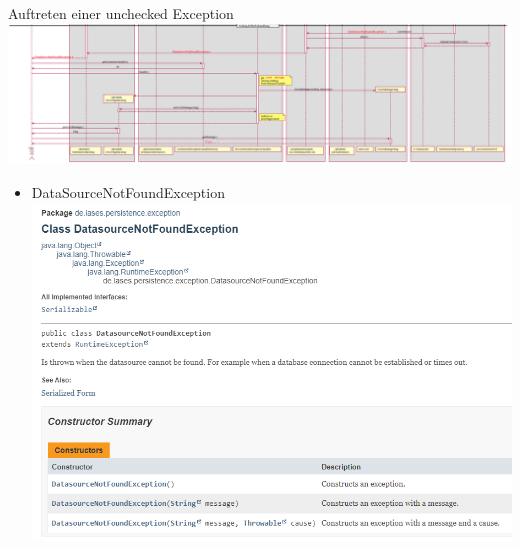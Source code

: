 \documentclass{beamer}
\begin{document}
    \begin{frame}{Auftreten einer unchecked Exception}
        \centering
        \includegraphics[height=1.1\textheight]{graphics/exc/seq_ex}
        \begin{itemize}
            \item DataSourceNotFoundException
            \centering
            \includegraphics[height=1.1\textheight]{graphics/exc/doc_ex}


\end{itemize}
\end{frame}
\end{document}
